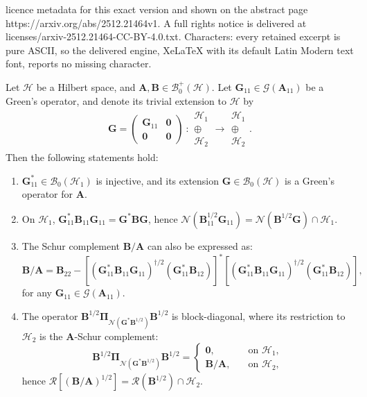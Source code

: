 \documentclass[10pt,a4paper]{amsart}
\newcommand{\m}[1]{\mathbf{#1}} %
\renewcommand{\c}[1]{\mathcal{#1}} %
\begin{document}
licence metadata for this exact version and shown on the abstract page https://arxiv.org/abs/2512.21464v1. A full rights notice is delivered at licenses/arxiv-2512.21464-CC-BY-4.0.txt. Characters: every retained excerpt is pure ASCII, so the delivered engine, XeLaTeX with its default Latin Modern text font, reports no missing character.
\begin{lemma}\label{lem:Schur:op}
Let $\c{H}$ be a Hilbert space, and $\m{A}, \m{B} \in \c{B}_{0}^{+}(\c{H})$. Let $\m{G}_{11} \in \c{G}(\m{A}_{11})$ be a Green's operator, and denote its trivial extension to $\c{H}$ by
\begin{align*}
    \m{G} =
    \begin{pmatrix}
    \m{G}_{11} & \m{0} \\
    \m{0} & \m{0}
    \end{pmatrix}
    \    :
    \begin{array}{c}
    \c{H}_{1} \\
    \oplus \\
    \c{H}_{2}
    \end{array}
    \rightarrow
    \begin{array}{c}
    \c{H}_{1} \\
    \oplus \\
    \c{H}_{2}
    \end{array}.
\end{align*}
Then the following statements hold:
\begin{enumerate}[leftmargin = *]
    \item $\m{G}_{11}^{*} \in \c{B}_{0}(\c{H}_{1})$ is injective, and its extension $\m{G} \in \c{B}_{0}(\c{H})$ is a Green's operator for $\m{A}$.
    \item On $\c{H}_{1}$, $\m{G}_{11}^{*} \m{B}_{11} \m{G}_{11} = \m{G}^{*} \m{B} \m{G}$, hence $\c{N}(\m{B}_{11}^{1/2} \m{G}_{11}) = \c{N}(\m{B}^{1/2} \m{G}) \cap \c{H}_{1}$.
    \item The Schur complement $\m{B}/\m{A}$ can also be expressed as:
    \begin{equation*}
        \m{B}/\m{A} = \m{B}_{22} - [(\m{G}_{11}^{*} \m{B}_{11} \m{G}_{11})^{\dagger/2} (\m{G}_{11}^{*} \m{B}_{12})]^{*} [(\m{G}_{11}^{*} \m{B}_{11} \m{G}_{11})^{\dagger/2} (\m{G}_{11}^{*} \m{B}_{12})],
    \end{equation*}
    for any $\m{G}_{11} \in \c{G}(\m{A}_{11})$. 
    \item The operator $\m{B}^{1/2} \m{\Pi}_{\c{N}(\m{G}^{*} \m{B}^{1/2})} \m{B}^{1/2}$ is block-diagonal, where its restriction to $\c{H}_{2}$ is the $\m{A}$-Schur complement:
    \begin{equation*}
        \m{B}^{1/2} \m{\Pi}_{\c{N}(\m{G}^{*} \m{B}^{1/2})} \m{B}^{1/2} =
        \begin{cases}
            \m{0}, &\quad \text{on } \c{H}_{1}, \\
            \m{B}/\m{A}, &\quad \text{on } \c{H}_{2},
        \end{cases}
    \end{equation*}
    hence $\c{R} [(\m{B}/\m{A})^{1/2}] = \c{R}(\m{B}^{1/2}) \cap \c{H}_{2}$.
\end{enumerate}
\end{lemma}
\end{document}
